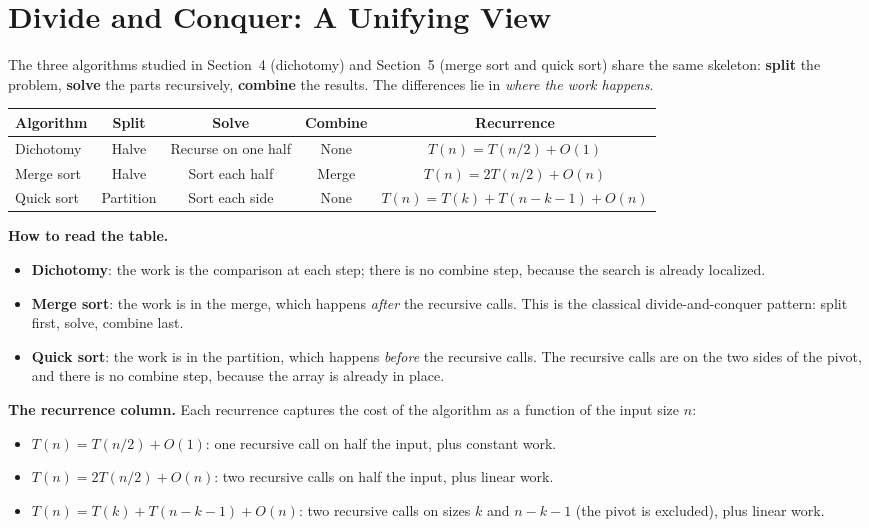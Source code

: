 \documentclass[11pt,a4paper]{article}
\begin{document}
\section{Divide and Conquer: A Unifying View}

The three algorithms studied in Section~4 (dichotomy) and Section~5 (merge sort and quick sort) share the same skeleton: \textbf{split} the problem, \textbf{solve} the parts recursively, \textbf{combine} the results. The differences lie in \emph{where the work happens}.

\begin{center}
\small
\begin{tabular}{lcccc}
\toprule
Algorithm & Split & Solve & Combine & Recurrence \\
\midrule
Dichotomy & Halve & Recurse on one half & None & $T(n) = T(n/2) + O(1)$ \\
Merge sort & Halve & Sort each half & Merge & $T(n) = 2T(n/2) + O(n)$ \\
Quick sort & Partition & Sort each side & None & $T(n) = T(k) + T(n{-}k{-}1) + O(n)$ \\
\bottomrule
\end{tabular}
\end{center}

\textbf{How to read the table.}
\begin{itemize}
    \item \textbf{Dichotomy}: the work is the comparison at each step; there is no combine step, because the search is already localized.
    \item \textbf{Merge sort}: the work is in the merge, which happens \emph{after} the recursive calls. This is the classical divide-and-conquer pattern: split first, solve, combine last.
    \item \textbf{Quick sort}: the work is in the partition, which happens \emph{before} the recursive calls. The recursive calls are on the two sides of the pivot, and there is no combine step, because the array is already in place.
\end{itemize}

\textbf{The recurrence column.} Each recurrence captures the cost of the algorithm as a function of the input size $n$:
\begin{itemize}
    \item $T(n) = T(n/2) + O(1)$: one recursive call on half the input, plus constant work.
    \item $T(n) = 2T(n/2) + O(n)$: two recursive calls on half the input, plus linear work.
    \item $T(n) = T(k) + T(n-k-1) + O(n)$: two recursive calls on sizes $k$ and $n-k-1$ (the pivot is excluded), plus linear work.
\end{itemize}
\end{document}
